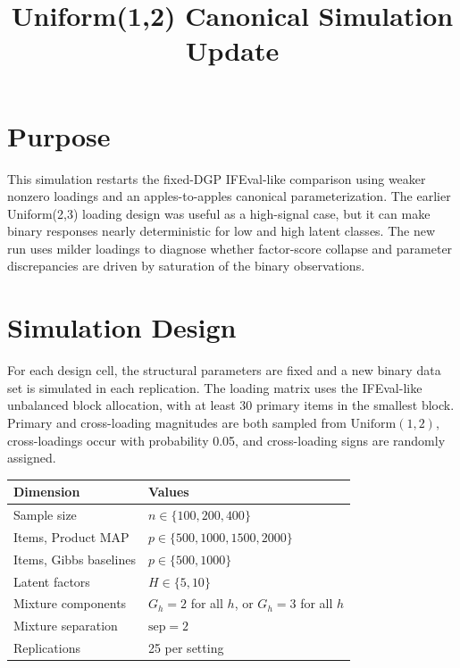 \documentclass[11pt]{article}
\title{\vspace{-2em}Uniform(1,2) Canonical Simulation Update}
\author{}
\date{\vspace{-2em}}
\begin{document}
\maketitle

\section*{Purpose}

This simulation restarts the fixed-DGP IFEval-like comparison using weaker
nonzero loadings and an apples-to-apples canonical parameterization. The earlier
Uniform(2,3) loading design was useful as a high-signal case, but it can make
binary responses nearly deterministic for low and high latent classes. The new
run uses milder loadings to diagnose whether factor-score collapse and
parameter discrepancies are driven by saturation of the binary observations.

\section*{Simulation Design}

For each design cell, the structural parameters are fixed and a new binary data
set is simulated in each replication. The loading matrix uses the IFEval-like
unbalanced block allocation, with at least 30 primary items in the smallest
block. Primary and cross-loading magnitudes are both sampled from
\(\mathrm{Uniform}(1,2)\), cross-loadings occur with probability 0.05, and
cross-loading signs are randomly assigned.

\begin{center}
\begin{tabular}{ll}
\toprule
Dimension & Values \\
\midrule
Sample size & \(n \in \{100,200,400\}\) \\
Items, Product MAP & \(p \in \{500,1000,1500,2000\}\) \\
Items, Gibbs baselines & \(p \in \{500,1000\}\) \\
Latent factors & \(H \in \{5,10\}\) \\
Mixture components & \(G_h = 2\) for all \(h\), or \(G_h = 3\) for all \(h\) \\
Mixture separation & \(\mathrm{sep}=2\) \\
Replications & 25 per setting \\
\bottomrule
\end{tabular}
\end{center}
\end{document}
